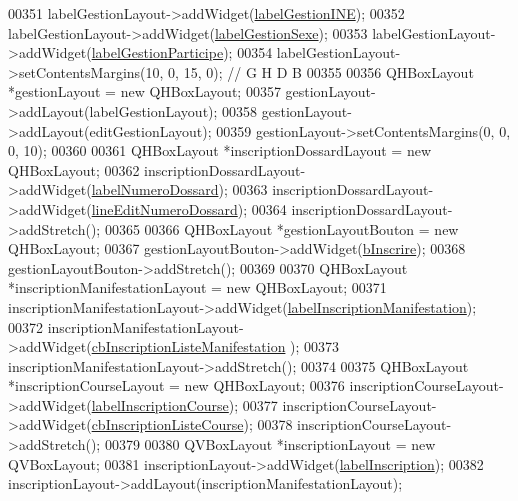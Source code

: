 \begin{DoxyCode}
00351     labelGestionLayout->addWidget(\hyperlink{class_i_h_m_gestion_cross_a56e8930b11c38475450df50a48d4581e}{labelGestionINE});
00352     labelGestionLayout->addWidget(\hyperlink{class_i_h_m_gestion_cross_a2e720e692a029a3f4f516a9ad00d2731}{labelGestionSexe});
00353     labelGestionLayout->addWidget(\hyperlink{class_i_h_m_gestion_cross_a0106cdcaf86997642d48dfad96a2368f}{labelGestionParticipe});
00354     labelGestionLayout->setContentsMargins(10, 0, 15, 0); \textcolor{comment}{// G H D B}
00355 
00356     QHBoxLayout *gestionLayout = \textcolor{keyword}{new} QHBoxLayout;
00357     gestionLayout->addLayout(labelGestionLayout);
00358     gestionLayout->addLayout(editGestionLayout);
00359     gestionLayout->setContentsMargins(0, 0, 0, 10);
00360 
00361     QHBoxLayout *inscriptionDossardLayout = \textcolor{keyword}{new} QHBoxLayout;
00362     inscriptionDossardLayout->addWidget(\hyperlink{class_i_h_m_gestion_cross_a3209e0dfc51bb3a17e2ef700a778178b}{labelNumeroDossard});
00363     inscriptionDossardLayout->addWidget(\hyperlink{class_i_h_m_gestion_cross_adeb4cfc9a218c06fca5cabc280a611e2}{lineEditNumeroDossard});
00364     inscriptionDossardLayout->addStretch();
00365 
00366     QHBoxLayout *gestionLayoutBouton = \textcolor{keyword}{new} QHBoxLayout;
00367     gestionLayoutBouton->addWidget(\hyperlink{class_i_h_m_gestion_cross_a1afbc04ebd42deafebbbdc998d0fc246}{bInscrire});
00368     gestionLayoutBouton->addStretch();
00369 
00370     QHBoxLayout *inscriptionManifestationLayout = \textcolor{keyword}{new} QHBoxLayout;
00371     inscriptionManifestationLayout->addWidget(\hyperlink{class_i_h_m_gestion_cross_affb681e48eb407d5d69d1ecb24da8377}{labelInscriptionManifestation});
00372     inscriptionManifestationLayout->addWidget(\hyperlink{class_i_h_m_gestion_cross_a317ffd7cc1c9aa5d6e55c53568e44f98}{cbInscriptionListeManifestation}
      );
00373     inscriptionManifestationLayout->addStretch();
00374 
00375     QHBoxLayout *inscriptionCourseLayout = \textcolor{keyword}{new} QHBoxLayout;
00376     inscriptionCourseLayout->addWidget(\hyperlink{class_i_h_m_gestion_cross_a88b058cc1d4031891e26eb62409af6bb}{labelInscriptionCourse});
00377     inscriptionCourseLayout->addWidget(\hyperlink{class_i_h_m_gestion_cross_aff44e6f1a225ee5b55783afe72049f83}{cbInscriptionListeCourse});
00378     inscriptionCourseLayout->addStretch();
00379 
00380     QVBoxLayout *inscriptionLayout = \textcolor{keyword}{new} QVBoxLayout;
00381     inscriptionLayout->addWidget(\hyperlink{class_i_h_m_gestion_cross_a58c321e2d95796d99e70a05260b8aff3}{labelInscription});
00382     inscriptionLayout->addLayout(inscriptionManifestationLayout);

\end{DoxyCode}
